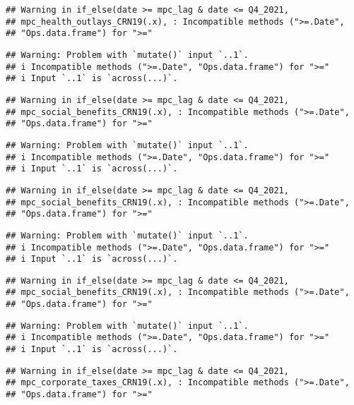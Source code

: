 \documentclass[
]{article}
\begin{document}
\begin{verbatim}
## Warning in if_else(date >= mpc_lag & date <= Q4_2021,
## mpc_health_outlays_CRN19(.x), : Incompatible methods (">=.Date",
## "Ops.data.frame") for ">="
\end{verbatim}

\begin{verbatim}
## Warning: Problem with `mutate()` input `..1`.
## i Incompatible methods (">=.Date", "Ops.data.frame") for ">="
## i Input `..1` is `across(...)`.
\end{verbatim}

\begin{verbatim}
## Warning in if_else(date >= mpc_lag & date <= Q4_2021,
## mpc_social_benefits_CRN19(.x), : Incompatible methods (">=.Date",
## "Ops.data.frame") for ">="
\end{verbatim}

\begin{verbatim}
## Warning: Problem with `mutate()` input `..1`.
## i Incompatible methods (">=.Date", "Ops.data.frame") for ">="
## i Input `..1` is `across(...)`.
\end{verbatim}

\begin{verbatim}
## Warning in if_else(date >= mpc_lag & date <= Q4_2021,
## mpc_social_benefits_CRN19(.x), : Incompatible methods (">=.Date",
## "Ops.data.frame") for ">="
\end{verbatim}

\begin{verbatim}
## Warning: Problem with `mutate()` input `..1`.
## i Incompatible methods (">=.Date", "Ops.data.frame") for ">="
## i Input `..1` is `across(...)`.
\end{verbatim}

\begin{verbatim}
## Warning in if_else(date >= mpc_lag & date <= Q4_2021,
## mpc_social_benefits_CRN19(.x), : Incompatible methods (">=.Date",
## "Ops.data.frame") for ">="
\end{verbatim}

\begin{verbatim}
## Warning: Problem with `mutate()` input `..1`.
## i Incompatible methods (">=.Date", "Ops.data.frame") for ">="
## i Input `..1` is `across(...)`.
\end{verbatim}

\begin{verbatim}
## Warning in if_else(date >= mpc_lag & date <= Q4_2021,
## mpc_corporate_taxes_CRN19(.x), : Incompatible methods (">=.Date",
## "Ops.data.frame") for ">="
\end{verbatim}
\end{document}
